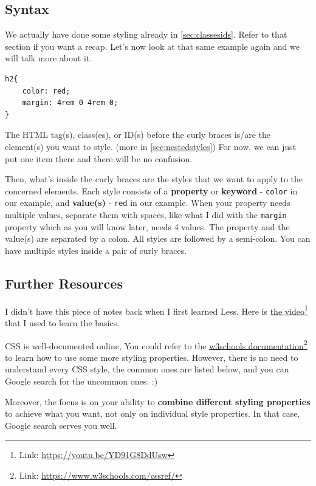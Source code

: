 \subsection*{Syntax}

We actually have done some styling already in \cref{sec:classesids}. Refer to that section if you want a recap.
Let's now look at that same example again and we will talk more about it.

\begin{lstlisting}[language=pug]
h2{
    color: red;
    margin: 4rem 0 4rem 0;
}
\end{lstlisting}

The HTML tag(s), class(es), or ID(s) before the curly braces is/are the element(s) you want to style. (more in \cref{sec:nestedstyles}) For now, we can just put one item there and there will be no confusion.
\vspace{6mm}

Then, what's inside the curly braces are the styles that we want to apply to the concerned elements. Each style consists of a \textbf{property} or \textbf{keyword} - \texttt{color} in our example, and \textbf{value(s)} - \texttt{red} in our example. When your property needs multiple values, separate them with spaces, like what I did with the \texttt{margin} property which as you will know later, needs 4 values. The property and the value(s) are separated by a colon. All styles are followed by a semi-colon. You can have multiple styles inside a pair of curly braces. 
\vspace{6mm}

\subsection*{Further Resources}

I didn't have this piece of notes back when I first learned Less. Here is \href{https://youtu.be/YD91G8DdUsw}{the video}\footnote{Link: \url{https://youtu.be/YD91G8DdUsw}} that I used to learn the basics. 

CSS is well-documented online, You could refer to the \href{https://www.w3schools.com/cssref/}{w3schools documentation}\footnote{Link: \url{https://www.w3schools.com/cssref/}} to learn how to use some more styling properties. 
However, there is no need to understand every CSS style, the common ones are listed below, and you can Google search for the uncommon ones. :)

Moreover, the focus is on your ability to \textbf{combine different styling properties} to achieve what you want, not only on individual style properties. In that case, Google search serves you well. 

